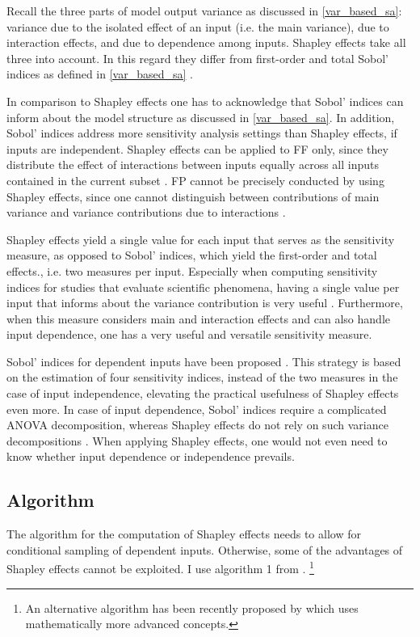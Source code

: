 Recall the three parts of model output variance as discussed in \cref{var_based_sa}: variance due to the isolated effect of an input (i.e. the main variance), due to interaction effects, and due to dependence among inputs. Shapley effects take all three into account. In this regard they differ from first-order and total Sobol' indices as defined in \cref{var_based_sa} \citep{O14}.

In comparison to Shapley effects one has to acknowledge that Sobol' indices can inform about the model structure as discussed in \cref{var_based_sa}. In addition, Sobol' indices address more sensitivity analysis settings than Shapley effects, if inputs are independent. Shapley effects can be applied to FF only, since they distribute the effect of interactions between inputs equally across all inputs contained in the current subset \citep{IP19}. FP cannot be precisely conducted by using Shapley effects, since one cannot distinguish between contributions of main variance and variance contributions due to interactions \citep{IP19}.

Shapley effects yield a single value for each input that serves as the sensitivity measure, as opposed to Sobol' indices, which yield the first-order and total effects., i.e. two measures per input. Especially when computing sensitivity indices for studies that evaluate scientific phenomena, having a single value per input that informs about the variance contribution is very useful \citep{SNS16}. Furthermore, when this measure considers main and interaction effects and can also handle input dependence, one has a very useful and versatile sensitivity measure.

Sobol' indices for dependent inputs have been proposed \citep{MTA15}. This strategy is based on the estimation of four sensitivity indices, instead of the two measures in the case of input independence, elevating the practical usefulness of Shapley effects even more. In case of input dependence, Sobol' indices require a complicated ANOVA decomposition, whereas Shapley effects do not rely on such variance decompositions \citep{IP19}. When applying Shapley effects, one would not even need to know whether input dependence or independence prevails.

\subsection{Algorithm} \label{comp_alg}

The algorithm for the computation of Shapley effects needs to allow for conditional sampling of dependent inputs. Otherwise, some of the advantages of Shapley effects cannot be exploited. I use algorithm 1 from \citet{SNS16}. \footnote{An alternative algorithm has been recently proposed by \citet{PRB20} which uses mathematically more advanced concepts.}

